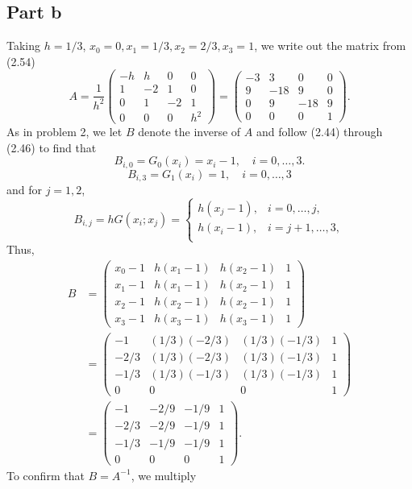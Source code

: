 \documentclass{article}
\begin{document}
\subsection{Part b}
Taking $h=1/3$, $x_0=0, x_1=1/3, x_2=2/3, x_3=1$, we write out the matrix from (2.54)
\[
A=\frac{1}{h^2}\begin{pmatrix}
-h&h&0&0\\
1&-2&1&0\\
0&1&-2&1\\
0&0&0&h^2
\end{pmatrix}=\begin{pmatrix}
-3&3&0&0\\
9&-18&9&0\\
0&9&-18&9\\
0&0&0&1
\end{pmatrix}.
\]
As in problem 2, we let $B$ denote the inverse of $A$ and follow (2.44) through (2.46) to find that
\[
B_{i,0}=G_0(x_i)=x_i-1, \quad i=0,\ldots,3.
\]
\[
B_{i,3}=G_1(x_i)=1, \quad i=0,\ldots,3
\]
and for $j=1,2$,
\[
B_{i,j}=hG(x_i;x_j)=\begin{cases}
h(x_j-1), &i=0,\ldots,j,\\
h(x_i-1), &i=j+1,\ldots,3,\\
\end{cases}
\]
Thus,
\begin{align*}
B&=\begin{pmatrix}
x_0-1&h(x_1-1)&h(x_2-1)&1\\
x_1-1&h(x_1-1)&h(x_2-1)&1\\
x_2-1&h(x_2-1)&h(x_2-1)&1\\
x_3-1&h(x_3-1)&h(x_3-1)&1\end{pmatrix}\\&=
\begin{pmatrix}
-1&(1/3)(-2/3)&(1/3)(-1/3)&1\\
-2/3&(1/3)(-2/3)&(1/3)(-1/3)&1\\
-1/3&(1/3)(-1/3)&(1/3)(-1/3)&1\\
0&0&0&1\end{pmatrix}\\&=
\begin{pmatrix}
-1&-2/9&-1/9&1\\
-2/3&-2/9&-1/9&1\\
-1/3&-1/9&-1/9&1\\
0&0&0&1\end{pmatrix}.
\end{align*}
To confirm that $B=A^{-1}$, we multiply
\end{document}
